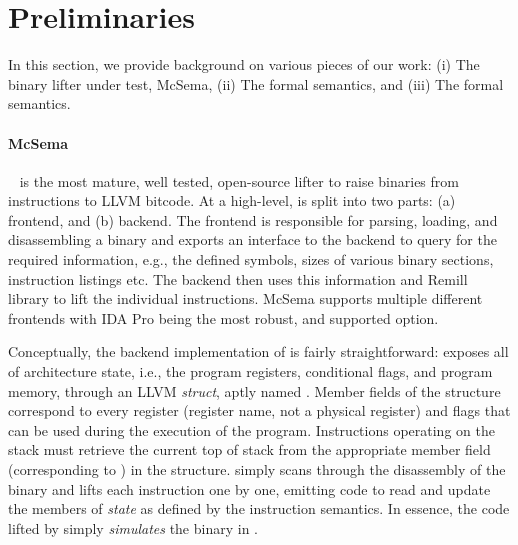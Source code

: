 \section{Preliminaries}
\label{sec:prelim}

In this section, we provide background on various pieces of our work:
(i) The binary lifter under test, McSema, (ii) The formal \ISA semantics, and
(iii) The formal \LLVM semantics.

\paragraph{McSema}\label{par:mcsema} \mcsema~\cite{McSema:Recon14} is the most
mature, well tested, open-source lifter to raise binaries from \ISA
instructions to LLVM bitcode.  At a high-level, \mcsema is split into two
parts: (a) frontend, and (b) backend. The frontend is responsible for parsing,
loading, and disassembling a binary and exports an interface to the backend to
query for the required information, e.g., the defined symbols, sizes of
various binary sections, instruction listings etc. The backend then uses this
information and Remill~\cite{Remill} library to lift the individual
instructions. McSema supports multiple different frontends with IDA Pro being
the most robust, and supported option.

Conceptually, the backend implementation of \mcsema is fairly straightforward:
\mcsema exposes all of architecture state, i.e., the program registers,
conditional flags, and program memory, through an LLVM \emph{struct}, aptly
named \Mcstate. 
Member fields
of the structure correspond to every register (register name, not a physical
register) and flags that can be used during the execution of the program. Instructions
operating on the stack must retrieve the current top of stack from the
appropriate member field (corresponding to ) in the structure.
\mcsema simply scans through the disassembly of the binary
and lifts each instruction one by one, emitting code to read and update the
members of \emph{state} as defined by the instruction semantics. In essence,
the code lifted by \mcsema simply \emph{simulates} the binary in \LLVM.


